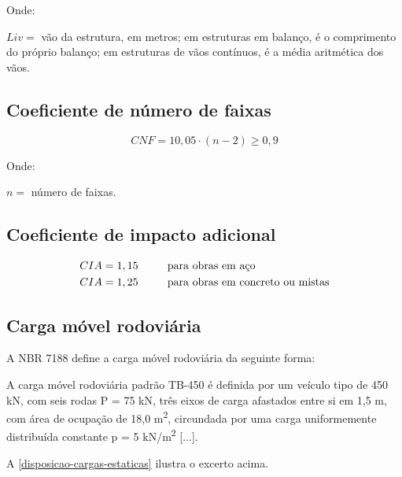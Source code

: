 Onde:

$ Liv = $ vão da estrutura, em metros; em estruturas em balanço, é o comprimento do próprio balanço; em estruturas de vãos contínuos, é a média aritmética dos vãos.	

\subsection{Coeficiente de número de faixas}

\begin{equation} \label{CNF}
  CNF = 1 0,05 \cdot (n-2) \geq 0,9
\end{equation}

Onde:

$ n = $ número de faixas.

\subsection{Coeficiente de impacto adicional}

\begin{equation} \label{CIA}
  \begin{split}
    CIA = 1,15 & \textrm{ \hspace{2em} para obras em aço} \\
    CIA = 1,25 & \textrm{ \hspace{2em} para obras em concreto ou mistas}
  \end{split}
\end{equation}

\subsection{Carga móvel rodoviária}

A NBR 7188 \cite{NBR7188:2013} define a carga móvel rodoviária da seguinte forma:

\begin{citacao}
A carga móvel rodoviária padrão TB-450 é definida por um veículo tipo de 450 kN, com seis rodas P = 75 kN, três eixos de carga afastados entre si em 1,5 m, com área de ocupação de 18,0 m\textsuperscript{2}, circundada por uma carga uniformemente distribuída constante p = 5 kN/m\textsuperscript{2} [...].
\end{citacao}

A \autoref{disposicao-cargas-estaticas} ilustra o excerto acima.

